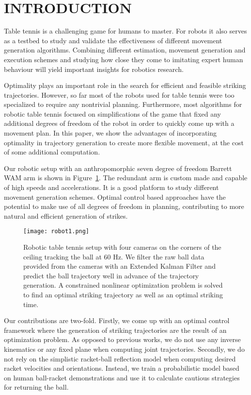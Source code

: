 \section{INTRODUCTION}

Table tennis is a challenging game for humans to master. For robots it also serves as a testbed to study and validate the effectiveness of different movement generation algorithms. Combining different estimation, movement generation and execution schemes and studying how close they come to imitating expert human behaviour will yield important insights for robotics research.

Optimality plays an important role in the search for efficient and feasible striking trajectories. However, so far most of the robots used for table tennis were too specialized to require any nontrivial planning. Furthermore, most algorithms for robotic table tennis focused on simplifications of the game that fixed any additional degrees of freedom of the robot in order to quickly come up with a movement plan. In this paper, we show the advantages of incorporating optimality in trajectory generation to create more flexible movement, at the cost of some additional computation. 

Our robotic setup with an anthropomorphic seven degree of freedom Barrett WAM arm is shown in Figure~\ref{robot}. The redundant arm is custom made and capable of high speeds and accelerations. It is a good platform to study different movement generation schemes. Optimal control based approaches have the potential to make use of all degrees of freedom in planning, contributing to more natural and efficient generation of strikes. %

\begin{figure}[t!]
\center
\texttt{[image: robot1.png]}			
\caption{Robotic table tennis setup with four cameras on the corners of the ceiling tracking the ball at 60 Hz. We filter the raw ball data provided from the cameras with an Extended Kalman Filter and predict the ball trajectory well in advance of the trajectory generation. A constrained nonlinear optimization problem is solved to find an optimal striking trajectory as well as an optimal striking time.}
\label{robot}
\end{figure}

Our contributions are two-fold. Firstly, we come up with an optimal control framework where the generation of striking trajectories are the result of an optimization problem. As opposed to previous works, we do not use any inverse kinematics or any fixed plane when computing joint trajectories. Secondly, we do not rely on the simplistic racket-ball reflection model when computing desired racket velocities and orientations. Instead, we train a probabilistic model based on human ball-racket demonstrations and use it to calculate cautious strategies for returning the ball.

